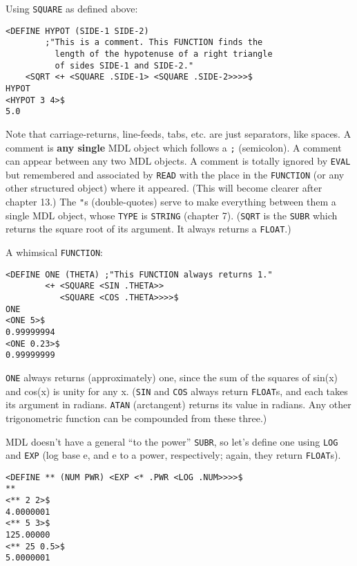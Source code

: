 \documentclass[a4paper]{scrbook}
\begin{document}
Using \texttt{SQUARE} as defined above:

\begin{verbatim}
<DEFINE HYPOT (SIDE-1 SIDE-2)
        ;"This is a comment. This FUNCTION finds the
          length of the hypotenuse of a right triangle
          of sides SIDE-1 and SIDE-2."
    <SQRT <+ <SQUARE .SIDE-1> <SQUARE .SIDE-2>>>>$
HYPOT
<HYPOT 3 4>$
5.0
\end{verbatim}

Note that carriage-returns, line-feeds, tabs, etc. are just separators, like spaces. A comment is \textbf{any single} MDL
object which follows a \texttt{;}  (semicolon). A comment can appear between any two MDL objects.
A comment is totally ignored by \texttt{EVAL} but remembered and associated by \texttt{READ} with the place in the
\texttt{FUNCTION} (or any other structured object) where it appeared. (This will become clearer after chapter 13.) The
\texttt{"}s (double-quotes) serve to make everything between them a single MDL object, whose \texttt{TYPE} is
\texttt{STRING} (chapter 7). (\texttt{SQRT} is the \texttt{SUBR} which returns the square root
of its argument. It always returns a \texttt{FLOAT}.)

A whimsical \texttt{FUNCTION}:

\begin{verbatim}
<DEFINE ONE (THETA) ;"This FUNCTION always returns 1."
        <+ <SQUARE <SIN .THETA>>
           <SQUARE <COS .THETA>>>>$
ONE
<ONE 5>$
0.99999994
<ONE 0.23>$
0.99999999
\end{verbatim}

\texttt{ONE} always returns (approximately) one, since the sum of the squares of sin(x) and cos(x) is unity for any x.
(\texttt{SIN}  and \texttt{COS} always return \texttt{FLOAT}s, and
each takes its argument in radians. \texttt{ATAN} (arctangent) returns its value in radians.
Any other trigonometric function can be compounded from these three.)

MDL doesn't have a general ``to the power'' \texttt{SUBR}, so let's define one using \texttt{LOG}
 and \texttt{EXP}  (log base e, and e to a power, respectively;
again, they return \texttt{FLOAT}s).

\begin{verbatim}
<DEFINE ** (NUM PWR) <EXP <* .PWR <LOG .NUM>>>>$
**
<** 2 2>$
4.0000001
<** 5 3>$
125.00000
<** 25 0.5>$
5.0000001
\end{verbatim}
\end{document}
